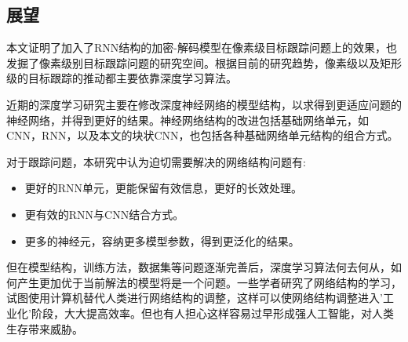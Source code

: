 \subsection{展望}
本文证明了加入了RNN结构的加密-解码模型在像素级目标跟踪问题上的效果，也发掘了像素级别目标跟踪问题的研究空间。根据目前的研究趋势，像素级以及矩形级的目标跟踪的推动都主要依靠深度学习算法。
\par
近期的深度学习研究主要在修改深度神经网络的模型结构，以求得到更适应问题的神经网络，并得到更好的结果。神经网络结构的改进包括基础网络单元，如CNN，RNN，以及本文的块状CNN，也包括各种基础网络单元结构的组合方式。
\par
对于跟踪问题，本研究中认为迫切需要解决的网络结构问题有:
\begin{itemize}
    \item 更好的RNN单元，更能保留有效信息，更好的长效处理。
    \item 更有效的RNN与CNN结合方式。
    \item 更多的神经元，容纳更多模型参数，得到更泛化的结果。
\end{itemize}
\par
但在模型结构，训练方法，数据集等问题逐渐完善后，深度学习算法何去何从，如何产生更加优于当前解法的模型将是一个问题。一些学者研究了网络结构的学习\supercite{cortes2017adanet}，试图使用计算机替代人类进行网络结构的调整，这样可以使网络结构调整进入'工业化'阶段，大大提高效率。但也有人担心这样容易过早形成强人工智能\supercite{kurzweil2005singularity}，对人类生存带来威胁。

